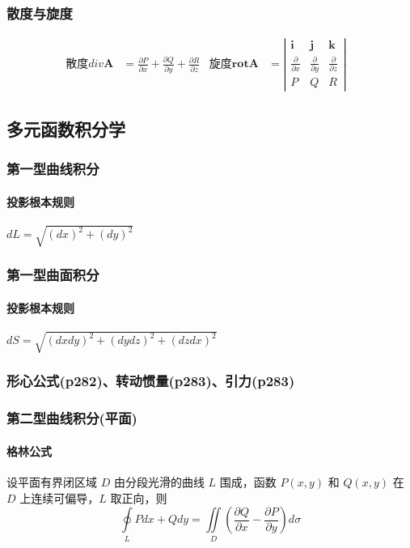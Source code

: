 ﻿\documentclass[a4paper,12pt,UTF8]{ctexart}
\begin{document}
    \subsubsection{散度与旋度}
    \begin{align*}
        \text{散度} div \mathbf{A}& = \frac{\partial P}{\partial x} + \frac{\partial Q}{\partial y} + \frac{\partial R}{\partial z}&
        \text{旋度} \mathbf{rot} \mathbf{A}& = 
        \left|\begin{array}{cccc}
            \mathbf{i}& \mathbf{j}& \mathbf{k}\\
            \frac{\partial}{\partial x}& \frac{\partial}{\partial y}& \frac{\partial}{\partial z}\\
            P& Q& R
        \end{array}\right|&
    \end{align*}
    
    \subsection{多元函数积分学}
    
    \subsubsection{第一型曲线积分}
    \paragraph{投影根本规则} \(dL=\sqrt{(dx)^2+(dy)^2}\)
    
    \subsubsection{第一型曲面积分}
    \paragraph{投影根本规则} \(dS=\sqrt{(dxdy)^2+(dydz)^2+(dzdx)^2}\) 
    
    \subsubsection{形心公式(p282)、转动惯量(p283)、引力(p283)}

    \subsubsection{第二型曲线积分(平面)}

    \paragraph{格林公式} 设平面有界闭区域 \(D\) 由分段光滑的曲线 \(L\) 围成，函数 \(P(x, y)\) 和 \(Q(x, y)\) 在 \(D\) 上连续可偏导，\(L\) 取正向，则
    \[ \oint \limits_{L} Pdx+Qdy = \iint \limits_{D} \left( \frac{\partial Q}{\partial x} - \frac{\partial P}{\partial y} \right)d\sigma \]
\end{document}
